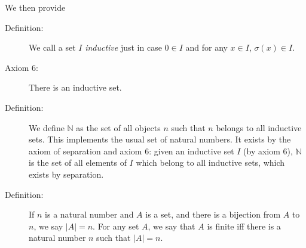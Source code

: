 \documentclass[12pt]{article}
\begin{document}
\begin{description}
We then provide 


\begin{description}


\item[Definition:]  We call a set $I$ {\em inductive\/} just in case $0 \in I$ and for any $x \in I$, $\sigma(x) \in I$.

\item[Axiom 6:]  There is an inductive set.

\item[Definition:]  We define $\mathbb N$ as the set of all objects $n$ such that $n$ belongs to all inductive sets.  This implements the usual set of natural numbers.
It exists by the axiom of separation and axiom 6:  given an inductive set $I$ (by axiom 6), $\mathbb N$ is the set of all elements of $I$ which belong to all inductive sets, which exists by separation.

\item[Definition:]  If $n$ is a natural number and $A$ is a set, and there is a bijection from $A$ to $n$, we say $|A|=n$.  For any set $A$, we say that $A$ is finite iff
there is a natural number $n$ such that $|A|=n$.

\end{description}







\end{description}
\end{document}
